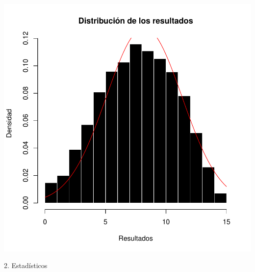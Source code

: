 \documentclass{article}
\begin{document}
\includegraphics{Documento_de_prueba-005}

2. Estadísticos
\end{document}
